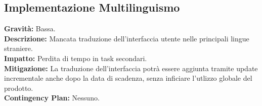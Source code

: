 \documentclass[a4paper,12pt]{article}
\begin{document}
\subsection{Implementazione Multilinguismo}
\textbf{Gravità:} Bassa.\\
\textbf{Descrizione:} Mancata traduzione dell'interfaccia utente nelle principali lingue straniere.\\
\textbf{Impatto:} Perdita di tempo in task secondari.\\
\textbf{Mitigazione:} La traduzione dell'interfaccia potrà essere aggiunta tramite update incrementale anche dopo la data di scadenza, senza inficiare l'utlizzo globale del prodotto.\\
\textbf{Contingency Plan:} Nessuno.
\end{document}
